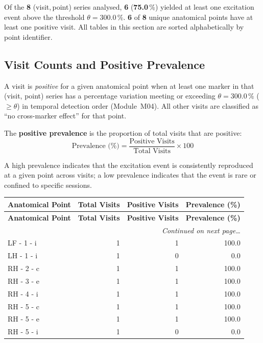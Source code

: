 \documentclass[a4paper,11pt]{article}
\begin{document}
\noindent
Of the \textbf{8} (visit,\,point) series analysed,
\textbf{6} (\textbf{75.0}\,\%) yielded at least one
excitation event above the threshold $\theta = 300.0\,\%$.
\textbf{6} of \textbf{8} unique anatomical points
have at least one positive visit.
All tables in this section are sorted alphabetically by point identifier.

\subsection{Visit Counts and Positive Prevalence}

A visit is \emph{positive} for a given anatomical point when at least one marker in that
(visit, point) series has a percentage variation meeting or exceeding
$\theta = 300.0\,\%$ ($\geq \theta$) in temporal detection order (Module~M04).
All other visits are classified as ``no cross-marker effect'' for that point.

The \textbf{positive prevalence} is the proportion of total visits that are positive:
\[
  \text{Prevalence (\%)} = \frac{\text{Positive Visits}}{\text{Total Visits}} \times 100
\]

A high prevalence indicates that the excitation event is consistently reproduced at a given
point across visits; a low prevalence indicates that the event is rare or confined to
specific sessions.

\begin{small}
\begin{longtable}{p{5cm}rrr}
\toprule
\textbf{Anatomical Point} &
\textbf{Total Visits} &
\textbf{Positive Visits} &
\textbf{Prevalence (\%)} \\
\midrule
\endfirsthead
\toprule
\textbf{Anatomical Point} &
\textbf{Total Visits} &
\textbf{Positive Visits} &
\textbf{Prevalence (\%)} \\
\midrule
\endhead
\midrule
\multicolumn{4}{r}{\small\emph{Continued on next page\ldots}} \\
\endfoot
\bottomrule
\endlastfoot
LF - 1 - i & 1 & 1 & 100.0 \\
LH - 1 - i & 1 & 0 & 0.0 \\
RH - 2 - c & 1 & 1 & 100.0 \\
RH - 3 - e & 1 & 1 & 100.0 \\
RH - 4 - i & 1 & 1 & 100.0 \\
RH - 5 - c & 1 & 1 & 100.0 \\
RH - 5 - e & 1 & 1 & 100.0 \\
RH - 5 - i & 1 & 0 & 0.0 \\
\end{longtable}
\end{small}
\end{document}

